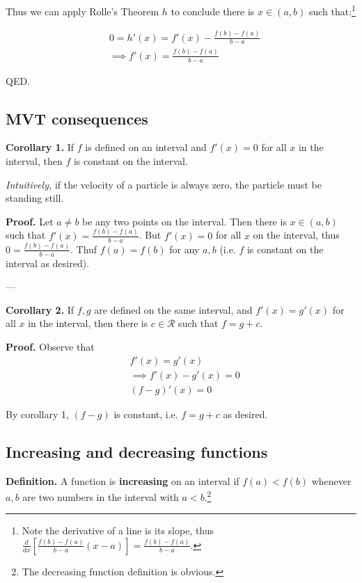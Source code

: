 Thus we can apply Rolle's Theorem $h$ to conclude there is $x\in(a,b)$
such that:\footnote{Note the derivative of a line is its slope, thus
  $\frac{d}{dx}\left[\frac{f(b)-f(a)}{b-a}(x-a)\right]=\frac{f(b)-f(a)}{b-a}$.}

\begin{align*}
  &0=h'(x)=f'(x)-\frac{f(b)-f(a)}{b-a}\\
  &\implies f'(x)=\frac{f(b)-f(a)}{b-a}
\end{align*}

QED.


\subsection{MVT consequences}
\textbf{Corollary 1.} If $f$ is defined on an interval and $f'(x)=0$
for all $x$ in the interval, then $f$ is constant on the interval.

\vs

\textit{Intuitively,} if the velocity of a particle is always zero,
the particle must be standing still.

\vs

\textbf{Proof.} Let $a\neq b$ be any two points on the interval. Then
there is $x\in(a,b)$ such that $f'(x)=\frac{f(b)-f(a)}{b-a}$. But
$f'(x)=0$ for all $x$ on the interval, thus $0=\frac{f(b)-f(a)}{b-a}$.
Thuf $f(a)=f(b)$ for any $a,b$ (i.e. $f$ is constant on the interval
as desired).

\vs---\vs

\textbf{Corollary 2.} If $f,g$ are defined on the same interval, and
$f'(x)=g'(x)$ for all $x$ in the interval, then there is
$c\in\mathcal{R}$ such that $f=g+c$.

\vs

\textbf{Proof.} Observe that
\begin{align*}
  &f'(x)=g'(x)\\
  &\implies f'(x)-g'(x)=0\\
  &(f-g)'(x)=0
\end{align*}

By corollary 1, $(f-g)$ is constant, i.e. $f=g+c$ as desired.

\subsection{Increasing and decreasing functions}

\textbf{Definition.} A function is \textbf{increasing} on an interval
if $f(a)<f(b)$ whenever $a,b$ are two numbers in the interval with
$a<b$.\footnote{The decreasing function definition is obvious.}

